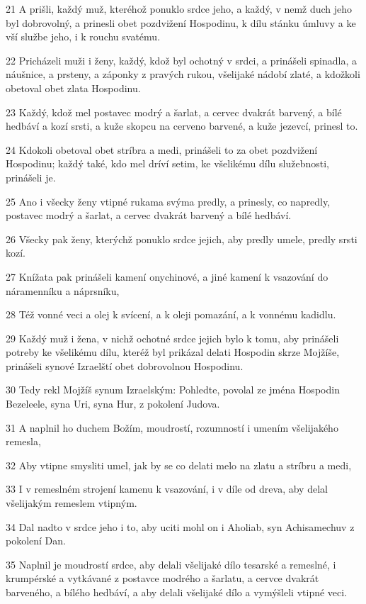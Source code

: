 \par 21 A prišli, každý muž, kteréhož ponuklo srdce jeho, a každý, v nemž duch jeho byl dobrovolný, a prinesli obet pozdvižení Hospodinu, k dílu stánku úmluvy a ke vší službe jeho, i k rouchu svatému.
\par 22 Pricházeli muži i ženy, každý, kdož byl ochotný v srdci, a prinášeli spinadla, a náušnice, a prsteny, a záponky z pravých rukou, všelijaké nádobí zlaté, a kdožkoli obetoval obet zlata Hospodinu.
\par 23 Každý, kdož mel postavec modrý a šarlat, a cervec dvakrát barvený, a bílé hedbáví a kozí srsti, a kuže skopcu na cerveno barvené, a kuže jezevcí, prinesl to.
\par 24 Kdokoli obetoval obet stríbra a medi, prinášeli to za obet pozdvižení Hospodinu; každý také, kdo mel dríví setim, ke všelikému dílu služebnosti, prinášeli je.
\par 25 Ano i všecky ženy vtipné rukama svýma predly, a prinesly, co napredly, postavec modrý a šarlat, a cervec dvakrát barvený a bílé hedbáví.
\par 26 Všecky pak ženy, kterýchž ponuklo srdce jejich, aby predly umele, predly srsti kozí.
\par 27 Knížata pak prinášeli kamení onychinové, a jiné kamení k vsazování do náramenníku a náprsníku,
\par 28 Též vonné veci a olej k svícení, a k oleji pomazání, a k vonnému kadidlu.
\par 29 Každý muž i žena, v nichž ochotné srdce jejich bylo k tomu, aby prinášeli potreby ke všelikému dílu, kteréž byl prikázal delati Hospodin skrze Mojžíše, prinášeli synové Izraelští obet dobrovolnou Hospodinu.
\par 30 Tedy rekl Mojžíš synum Izraelským: Pohledte, povolal ze jména Hospodin Bezeleele, syna Uri, syna Hur, z pokolení Judova.
\par 31 A naplnil ho duchem Božím, moudrostí, rozumností i umením všelijakého remesla,
\par 32 Aby vtipne smysliti umel, jak by se co delati melo na zlatu a stríbru a medi,
\par 33 I v remeslném strojení kamenu k vsazování, i v díle od dreva, aby delal všelijakým remeslem vtipným.
\par 34 Dal nadto v srdce jeho i to, aby uciti mohl on i Aholiab, syn Achisamechuv z pokolení Dan.
\par 35 Naplnil je moudrostí srdce, aby delali všelijaké dílo tesarské a remeslné, i krumpérské a vytkávané z postavce modrého a šarlatu, a cervce dvakrát barveného, a bílého hedbáví, a aby delali všelijaké dílo a vymýšleli vtipné veci.

